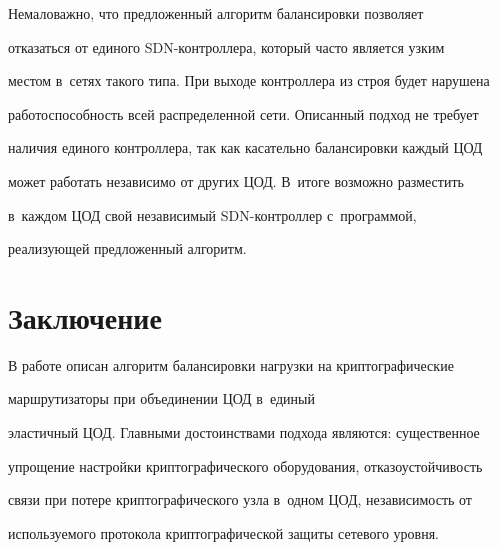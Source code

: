   


  Немаловажно, что предложенный алгоритм балансировки позволяет 


отказаться от единого SDN-конт\-рол\-ле\-ра, который часто является узким 


местом в~сетях такого типа. При выходе контроллера из строя будет нарушена 


работоспособность всей распределенной сети. Описанный подход не требует 


наличия единого контроллера, так как касательно балансировки каждый ЦОД 


может работать независимо от других ЦОД. В~итоге возможно разместить 


в~каждом ЦОД свой независимый SDN-конт\-рол\-лер с~программой, 


реализующей предложенный алгоритм.





\section{Заключение}





  В работе описан алгоритм балансировки нагрузки на криптографические 


маршрутизаторы при объединении ЦОД в~единый 


эластичный ЦОД. Главными достоинствами подхода являются: существенное 


упрощение настройки крип\-то\-гра\-фи\-че\-ско\-го оборудования, отказоустойчивость 


связи при потере крип\-то\-гра\-фи\-че\-ско\-го узла в~одном ЦОД, независимость от 


используемого протокола крип\-то\-гра\-фи\-че\-ской защиты сетевого уровня.


  


